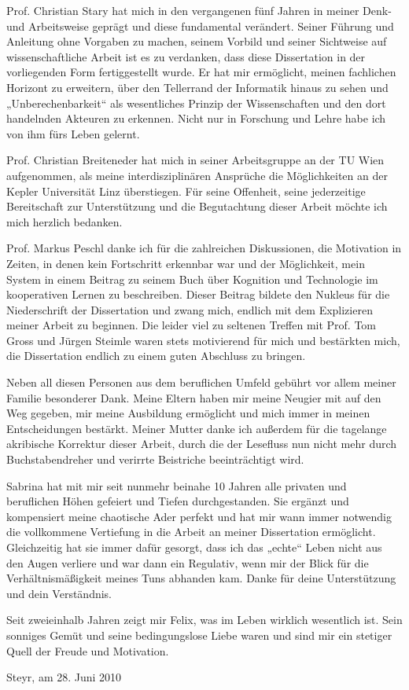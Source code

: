 Prof. Christian Stary hat mich in den vergangenen fünf Jahren in meiner Denk- und Arbeitsweise geprägt und diese fundamental verändert. Seiner Führung und Anleitung ohne Vorgaben zu machen, seinem Vorbild und seiner Sichtweise auf wissenschaftliche Arbeit ist es zu verdanken, dass diese Dissertation in der vorliegenden Form fertiggestellt wurde. Er hat mir ermöglicht, meinen fachlichen Horizont zu erweitern, über den Tellerrand der Informatik hinaus zu sehen und „Unberechenbarkeit“ als wesentliches Prinzip der Wissenschaften und den dort handelnden Akteuren zu erkennen. Nicht nur in Forschung und Lehre habe ich von ihm fürs Leben gelernt.

Prof. Christian Breiteneder hat mich in seiner Arbeitsgruppe an der TU Wien aufgenommen, als meine interdisziplinären Ansprüche die Möglichkeiten an der Kepler Universität Linz überstiegen. Für seine Offenheit, seine jederzeitige Bereitschaft zur Unterstützung und die Begutachtung dieser Arbeit möchte ich mich herzlich bedanken.

Prof. Markus Peschl danke ich für die zahlreichen Diskussionen, die Motivation in Zeiten, in denen kein Fortschritt erkennbar war und der Möglichkeit, mein System in einem Beitrag zu seinem Buch über Kognition und Technologie im kooperativen Lernen zu beschreiben. Dieser Beitrag bildete den Nukleus für die Niederschrift der Dissertation und zwang mich, endlich mit dem Explizieren meiner Arbeit zu beginnen. Die leider viel zu seltenen Treffen mit Prof. Tom Gross und Jürgen Steimle waren stets motivierend für mich und bestärkten mich, die Dissertation endlich zu einem guten Abschluss zu bringen.

Neben all diesen Personen aus dem beruflichen Umfeld gebührt vor allem meiner Familie besonderer Dank. Meine Eltern haben mir meine Neugier mit auf den Weg gegeben, mir meine Ausbildung ermöglicht und mich immer in meinen Entscheidungen bestärkt. Meiner Mutter danke ich außerdem für die tagelange akribische Korrektur dieser Arbeit, durch die der Lesefluss nun nicht mehr durch Buchstabendreher und verirrte Beistriche beeinträchtigt wird.

Sabrina hat mit mir seit nunmehr beinahe 10 Jahren alle privaten und beruflichen Höhen gefeiert und Tiefen durchgestanden. Sie ergänzt und kompensiert meine chaotische Ader perfekt und hat mir wann immer notwendig die vollkommene Vertiefung in die Arbeit an meiner Dissertation ermöglicht. Gleichzeitig hat sie immer dafür gesorgt, dass ich das „echte“ Leben nicht aus den Augen verliere und war dann ein Regulativ, wenn mir der Blick für die Verhältnismäßigkeit meines Tuns abhanden kam. Danke für deine Unterstützung und dein Verständnis.

Seit zweieinhalb Jahren zeigt mir Felix, was im Leben wirklich wesentlich ist. Sein sonniges Gemüt und seine bedingungslose Liebe waren und sind mir ein stetiger Quell der Freude und Motivation. 

\begin{flushright}
 Steyr, am 28. Juni 2010
\end{flushright}

